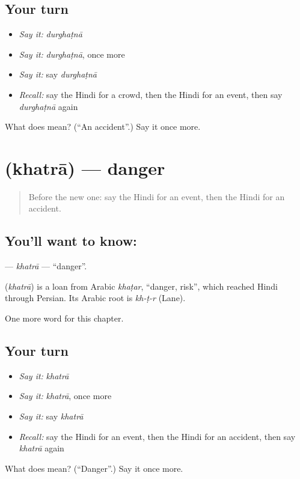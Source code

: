 \subsection*{Your turn}
\begin{itemize}
\raggedright
  \item \emph{Say it:} \emph{durghaṭnā}
  \item \emph{Say it:} \emph{durghaṭnā}, once more
  \item \emph{Say it:} say \emph{durghaṭnā}
  \item \emph{Recall:} say the Hindi for a crowd, then the Hindi for an event, then say \emph{durghaṭnā} again
\end{itemize}

\begin{tcolorbox}[breakable,colback=teal!4,colframe=teal!35!black,title={Before you move on}]
What does  mean? (\textquotedblleft{}An accident\textquotedblright{}.) Say it once more.
\end{tcolorbox}
\section[\texorpdfstring{\hi{ख़तरा} (khatrā)}{ख़तरा (khatrā)}]{ (khatrā) — danger}

\label{lesson:HI-C259-khatra}



\begin{quote}
Before the new one: say the Hindi for an event, then the Hindi for an accident.
\end{quote}

\subsection*{You'll want to know: }
\textbf{} — \emph{khatrā} — \textquotedblleft{}danger\textquotedblright{}.

\begin{cousinweb}
\textbf{} (\emph{khatrā}) is a loan from Arabic \emph{khaṭar}, \textquotedblleft{}danger, risk\textquotedblright{}, which reached Hindi through Persian. Its Arabic root is \emph{kh-ṭ-r} (Lane).
\end{cousinweb}

\begin{grammarlens}[title={What you've built}]
One more word for this chapter.
\end{grammarlens}

\subsection*{Your turn}
\begin{itemize}
\raggedright
  \item \emph{Say it:} \emph{khatrā}
  \item \emph{Say it:} \emph{khatrā}, once more
  \item \emph{Say it:} say \emph{khatrā}
  \item \emph{Recall:} say the Hindi for an event, then the Hindi for an accident, then say \emph{khatrā} again
\end{itemize}

\begin{tcolorbox}[breakable,colback=teal!4,colframe=teal!35!black,title={Before you move on}]
What does  mean? (\textquotedblleft{}Danger\textquotedblright{}.) Say it once more.
\end{tcolorbox}
